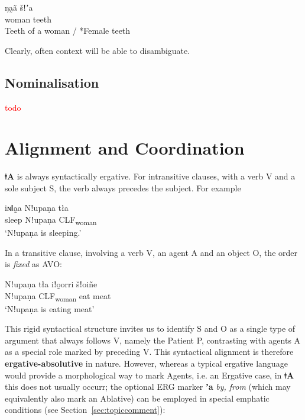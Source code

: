 \documentclass[11pt,a5paper]{book}
\newcommand{\qcn}[1]{\textcolor{AccentText}{\large\textbf{#1}}}
\newcommand{\langname}{\qcn{ǂA}}
\newcommand{\transl}[2]{\qcn{#1} \emph{#2}}
\newcommand{\grammsc}[1]{\textsc{#1}}
\newcommand{\CLF}[1]{\grammsc{CLF}\textsubscript{#1}}
\newcommand{\ERG}{\grammsc{ERG}}
\newcommand{\cmnt}[1]{\textcolor{red}{#1}}
\begin{document}
\begin{exe}
\ex
\gll ŋa̰ã šǃʼa\\
woman teeth\\
\glt Teeth of a woman / *Female teeth
\end{exe}

Clearly, often context will be able to disambiguate. 

\subsection{Nominalisation}

\cmnt{todo}

\section{Alignment and Coordination}

\langname{} is always syntactically ergative. For intransitive clauses, with a verb V and a sole subject S, the verb always precedes the subject. For example

\begin{exe}
	\ex
	\gll iɴǁa̰a Nǃupaṇa tła \\
	sleep Nǃupaṇa \CLF{woman}\\
	\glt `Nǃupaṇa is sleeping.'
\end{exe}

In a transitive clause, involving a verb V, an agent A and an object O, the order is \emph{fixed} as AVO:

\begin{exe}
	\ex
	\gll Nǃupaṇa 	tła 	iǃo̰orri 	šǃoiñe \\
		Nǃupaṇa 	\CLF{woman} 	eat 	meat\\
	\glt `Nǃupaṇa is eating meat'
\end{exe}

This rigid syntactical structure invites us to identify S and O as a single type of argument that always follows V, namely the Patient P, contrasting with agents A as a special role marked by preceding V. This syntactical alignment is therefore \textbf{ergative-absolutive} in nature. However, whereas a typical ergative language would provide a morphological way to mark Agents, i.e. an Ergative case, in \langname{} this does not usually occurr; the optional \ERG{} marker \transl{ʼa}{by, from} (which may equivalently also mark an Ablative) can be employed in special emphatic conditions (see Section~\ref{sec:topiccomment}):
\end{document}
